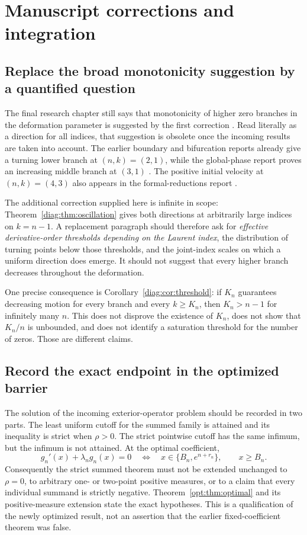 \section{Manuscript corrections and integration}
\label{sec:corrections}

\subsection{Replace the broad monotonicity suggestion by a quantified question}

The final research chapter still says that monotonicity of higher zero
branches in the deformation parameter is suggested by the first
correction \cite{ProjectDiscovery}. Read literally as a direction for
all indices, that suggestion is obsolete once the incoming results are
taken into account. The earlier boundary and bifurcation reports already
give a turning lower branch at $(n,k)=(2,1)$, while the global-phase
report proves an increasing middle branch at $(3,1)$
\cite{IncomingBoundary,IncomingBifurcation,IncomingPhase}.
The positive initial velocity at $(n,k)=(4,3)$ also appears in the
formal-reductions report \cite{IncomingReductions}.

The additional correction supplied here is infinite in scope:
Theorem~\ref{diag:thm:oscillation} gives both directions at arbitrarily
large indices on $k=n-1$. A replacement paragraph should therefore
ask for \emph{effective derivative-order thresholds depending on the
Laurent index}, the distribution of turning points below those
thresholds, and the joint-index scales on which a uniform direction
does emerge. It should not suggest that every higher branch decreases
throughout the deformation.

One precise consequence is Corollary~\ref{diag:cor:threshold}:
if $K_n$ guarantees decreasing motion for every branch and every
$k\ge K_n$, then $K_n>n-1$ for infinitely many $n$.
This does not disprove the existence of $K_n$, does not show that
$K_n/n$ is unbounded, and does not identify a saturation threshold
for the number of zeros. Those are different claims.

\subsection{Record the exact endpoint in the optimized barrier}

The solution of the incoming exterior-operator problem should be recorded
in two parts. The least uniform cutoff for the summed family is attained
and its inequality is strict when $\rho>0$. The strict pointwise cutoff
has the same infimum, but the infimum is not attained. At the optimal
coefficient,
\[
 g_n'(x)+\lambda_ng_n(x)=0
 \quad\Longleftrightarrow\quad
 x\in\{B_n,e^{n+r_n}\},\qquad x\ge B_n.
\]
Consequently the strict summed theorem must not be extended unchanged to
$\rho=0$, to arbitrary one- or two-point positive measures, or to a
claim that every individual summand is strictly negative.
Theorem~\ref{opt:thm:optimal} and its positive-measure extension state
the exact hypotheses. This is a qualification of the newly optimized
result, not an assertion that the earlier fixed-coefficient theorem
was false.


